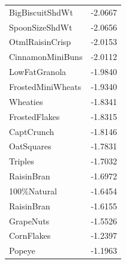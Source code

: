 \begin{longtable}{@{}lr@{}}
BigBiscuitShdWt & -2.0667 \\
SpoonSizeShdWt & -2.0656 \\
OtmlRaisinCrisp & -2.0153 \\
CinnamonMiniBuns & -2.0112 \\
LowFatGranola & -1.9840 \\
FrostedMiniWheats & -1.9340 \\
Wheaties & -1.8341 \\
FrostedFlakes & -1.8315 \\
CaptCrunch & -1.8146 \\
OatSquares & -1.7831 \\
Triples & -1.7032 \\
RaisinBran & -1.6972 \\
100\%Natural & -1.6454 \\
RaisinBran & -1.6155 \\
GrapeNuts & -1.5526 \\
CornFlakes & -1.2397 \\
Popeye & -1.1963 \\
\bottomrule
\end{longtable}
\endgroup
